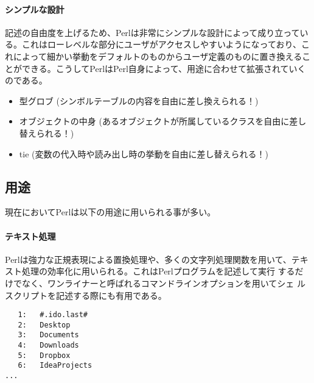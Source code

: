 \documentclass[a4paper,9pt]{jarticle}
\begin{document}
\paragraph{シンプルな設計}
記述の自由度を上げるため、Perlは非常にシンプルな設計によって成り立っている。これはローレベルな部分にユーザがアクセスしやすいようになっており、これによって細かい挙動をデフォルトのものからユーザ定義のものに置き換えることができる。こうしてPerlはPerl自身によって、用途に合わせて拡張されていくのである。
\begin{itemize}
  \item 型グロブ (シンボルテーブルの内容を自由に差し換えられる！)
  \item オブジェクトの中身 (あるオブジェクトが所属しているクラスを自由に差し替えられる！)
  \item tie (変数の代入時や読み出し時の挙動を自由に差し替えられる！)
\end{itemize}

\subsection{用途}
現在においてPerlは以下の用途に用いられる事が多い。
\paragraph{テキスト処理}
Perlは強力な正規表現による置換処理や、多くの文字列処理関数を用いて、テキ
スト処理の効率化に用いられる。これはPerlプログラムを記述して実行
するだけでなく、ワンライナーと呼ばれるコマンドラインオプションを用いてシェ
ルスクリプトを記述する際にも有用である。

\begin{lstlisting}[caption=標準入力のソースに行番号を付けて標準出力へ]
% ls | perl -ple 'printf "%4d:\t", $.'
   1:	#.ido.last#
   2:	Desktop
   3:	Documents
   4:	Downloads
   5:	Dropbox
   6:	IdeaProjects
...
\end{lstlisting}　
\end{document}
